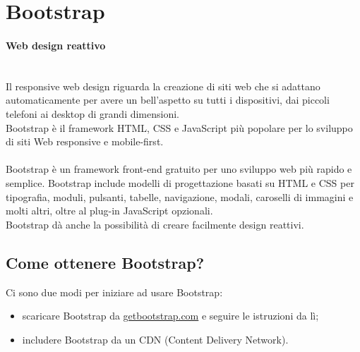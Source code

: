 \documentclass{article}
\begin{document}
\section{Bootstrap}
\paragraph{Web design reattivo} \mbox{} \\
Il responsive web design riguarda la creazione di siti web che si adattano automaticamente per avere un bell'aspetto su tutti i dispositivi, dai piccoli
telefoni ai desktop di grandi dimensioni. \\ Bootstrap è il framework HTML, CSS e JavaScript più popolare per lo sviluppo di siti Web responsive e mobile-first.
\paragraph{} Bootstrap è un framework front-end gratuito per uno sviluppo web più rapido e semplice. Bootstrap include modelli di progettazione basati su HTML e CSS per tipografia, moduli, pulsanti, tabelle, navigazione, modali, caroselli di immagini e molti altri, oltre al plug-in JavaScript opzionali.
\\ Bootstrap dà anche la possibilità di creare facilmente design reattivi.
\subsection{Come ottenere Bootstrap?}
Ci sono due modi per iniziare ad usare Bootstrap:
\begin{itemize}
    \item scaricare Bootstrap da \url{getbootstrap.com} e seguire le istruzioni da lì;
    \item includere Bootstrap da un CDN (Content Delivery Network).
\end{itemize}
\end{document}
